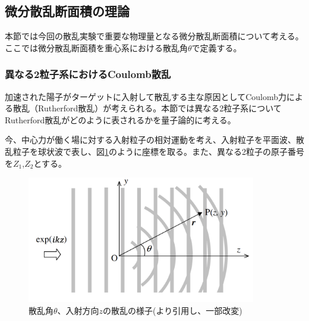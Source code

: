 \documentclass[a4paper,11pt,dvipdfmx]{jsarticle}
\begin{document}
\setcounter{page}{1}
\renewcommand\thefootnote{\arabic{footnote})}
\subsection{微分散乱断面積の理論}
本節では今回の散乱実験で重要な物理量となる微分散乱断面積について考える。
ここでは微分散乱断面積を重心系における散乱角$\theta$で定義する。
\subsubsection{異なる2粒子系におけるCoulomb散乱\cite{2017}\cite{ion}}
加速された陽子がターゲットに入射して散乱する主な原因としてCoulomb力による散乱（Rutherford散乱）が考えられる。本節では異なる2粒子系についてRutherford散乱がどのように表されるかを量子論的に考える。

今、中心力が働く場に対する入射粒子の相対運動を考え、入射粒子を平面波、散乱粒子を球状波で表し、図\ref{fig:qmscattering}のように座標を取る。また、異なる2粒子の原子番号を$Z_{1}$,$Z_{2}$とする。
\begin{figure}[hbtp]
\centering
\includegraphics[width=10cm]{picture/cstheory/qmscattering.png}
\caption{散乱角$\theta$、入射方向$z$の散乱の様子(\cite{ion}より引用し、一部改変)}
\label{fig:qmscattering}
\end{figure}
\end{document}
